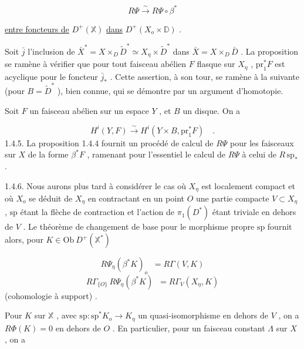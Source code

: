 \begin{equation*}
R\Psi \stackrel{\sim}{\longrightarrow} R\Psi \circ \beta^*
\end{equation*}


 \underline{entre foncteurs de} $D^+(\mathbb{X})$ \underline{dans} $D^+(X_o \times \mathbb{D})$ .

Soit $\bar{j}$ l'inclusion de $\bar{X}^* = X \times_D \widetilde{D}^* \simeq X_\eta \times \widetilde{D}^*$ dans $\bar{X} = X \times_D \bar{D}$ . La proposition se ramène à vérifier que pour tout faisceau abélien $F$ flasque sur $X_\eta$ , $\mathrm{pr}_1^* F$ est acyclique pour le foncteur $\bar{j}_*$ . Cette assertion, à son tour, se ramène à la suivante (pour $B = \widetilde{D}^*$ ), bien connue, qui se démontre par un argument d'homotopie.

Soit $F$ un faisceau abélien sur un espace $Y$ , et $B$ un disque. On a

\begin{equation*}
H^i(Y, F) \overset{\sim}{\longrightarrow} H^i(Y \times B, \mathrm{pr}_1^* F) \quad .
\end{equation*}
1.4.5. La proposition 1.4.4 fournit un procédé de calcul de $R\Psi$ pour les faisceaux sur $X$ de la forme $\beta^* F$ , ramenant pour l'essentiel le calcul de $R\Psi$ à celui de $R\, \mathrm{sp}_*$ .

1.4.6. Nous aurons plus tard à considérer le cas où $X_\eta$ est localement compact et où $X_o$ se déduit de $X_\eta$ en contractant en un point $O$ une partie compacte $V \subset X_\eta$ , $\mathrm{sp}$ étant la flèche de contraction et l'action de $\pi_1(D^*)$ étant triviale en dehors de $V$ . Le théorème de changement de base pour le morphisme propre $\mathrm{sp}$ fournit alors, pour $K \in \mathrm{Ob}\ D^+(\mathbb{X}^*)$

\begin{equation}\tag{1.4.6.1}
R\Psi_\eta(\beta^* K)_o \;\; = R\Gamma (V, K)
\end{equation}
\begin{equation}\tag{1.4.6.2}
R\Gamma_{\{O\}} \, R\Psi_\eta(\beta^* K) \;\; = R\Gamma_V(X_\eta , K)
\end{equation}
(cohomologie à support) .

Pour $K$ sur $\mathbb{X}$ , avec $\mathrm{sp} : \mathrm{sp}^* K_o \longrightarrow K_\eta$ un quasi-isomorphisme en dehors de $V$ , on a $R\Phi(K) = 0$ en dehors de $O$ . En particulier, pour un faisceau constant $\Lambda$ sur $X$ , on a

